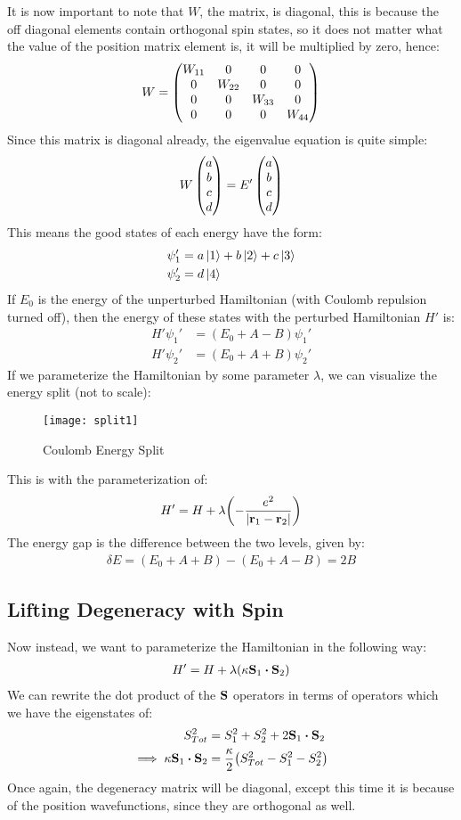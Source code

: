 \documentclass[12pt]{article}
\theoremstyle{plain}
\theoremstyle{definition}
\begin{document}
It is now important to note that $W$, the matrix, is diagonal, this is because the off diagonal elements contain orthogonal spin states, so it does not matter what the value of the position matrix element is, it will be multiplied by zero, hence:
\begin{align*}
  W=\pmqty{\dmat[0]{W_{11},W_{22},W_{33},W_{44}}}
\end{align*}
Since this matrix is diagonal already, the eigenvalue equation is quite simple:
\begin{align*}
  W\pmqty{a\\b\\c\\d}=E'\pmqty{a\\b\\c\\d}
\end{align*}
This means the good states of each energy have the form:
\begin{align*}
  \psi_1'&=a\ket{1}+b\ket{2}+c\ket{3}\\
  \psi_2'&=d\ket{4}
\end{align*}
If $E_0$ is the energy of the unperturbed Hamiltonian (with Coulomb repulsion turned off), then the energy of these states with the perturbed Hamiltonian $H'$ is:
\begin{align*}
  H'\psi_1'&=(E_0+A-B)\psi_1'\\
  H'\psi_2'&=(E_0+A+B)\psi_2'
\end{align*}
If we parameterize the Hamiltonian by some parameter $\lambda$, we can visualize the energy split (not to scale):
\begin{figure}[H]
  \centering
  \texttt{[image: split1]}
  \caption{Coulomb Energy Split}
\end{figure}
This is with the parameterization of:
\begin{align*}
  H'=H+\lambda\qty(-\frac{e^2}{\abs{\vb{r}_1-\vb{r}_2}})
\end{align*}
The energy gap is the difference between the two levels, given by:
\begin{align*}
  \delta E=(E_0+A+B)-(E_0+A-B)=2B
\end{align*}
\subsection{Lifting Degeneracy with Spin}
Now instead, we want to parameterize the Hamiltonian in the following way:
\begin{align*}
  H'=H+\lambda\qty(\kappa\vb{S}_1\vdot\vb{S}_2)
\end{align*}
We can rewrite the dot product of the $\vb{S}$ operators in terms of operators which we have the eigenstates of:
\begin{align*}
  S_{Tot}^2&=S_1^2+S_2^2+2\vb{S}_1\vdot\vb{S}_2\\
  \implies\kappa\vb{S}_1\vdot\vb{S}_2&=\frac\kappa2\qty(S_{Tot}^2-S_1^2-S_2^2)
\end{align*}
Once again, the degeneracy matrix will be diagonal, except this time it is because of the position wavefunctions, since they are orthogonal as well.
\end{document}
